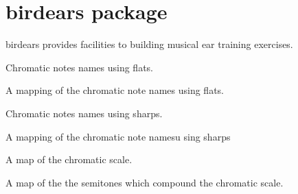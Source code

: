 \documentclass[letterpaper,10pt,english]{sphinxmanual}
\begin{document}
\chapter{birdears package}
\label{\detokenize{index:birdears-package}}\label{\detokenize{index:module-birdears}}
birdears provides facilities to building musical ear training exercises.

\begin{fulllineitems}
\label{\detokenize{index:birdears.CHROMATIC_FLAT}}
 \textendash{} Chromatic notes names using flats.

A mapping of the chromatic note names using flats.

\end{fulllineitems}


\begin{fulllineitems}
\label{\detokenize{index:birdears.CHROMATIC_SHARP}}
 \textendash{} Chromatic notes names using sharps.

A mapping of the chromatic note namesu sing sharps

\end{fulllineitems}


\begin{fulllineitems}
\label{\detokenize{index:birdears.CHROMATIC_TYPE}}
 \textendash{} A map of the chromatic scale.

A map of the the semitones which compound the chromatic scale.

\end{fulllineitems}

\end{document}
